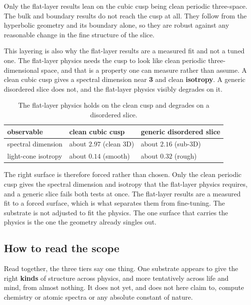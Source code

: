 \begin{principle}
Only the flat-layer results lean on the cubic cusp being clean periodic three-space. The bulk and boundary results do not reach the cusp at all. They follow from the hyperbolic geometry and its boundary alone, so they are robust against any reasonable change in the fine structure of the slice.
\end{principle}

This layering is also why the flat-layer results are a measured fit and not a tuned one. The flat-layer physics needs the cusp to look like clean periodic three-dimensional space, and that is a property one can measure rather than assume. A clean cubic cusp gives a spectral dimension near \textbf{3} and clean \textbf{isotropy}. A generic disordered slice does not, and the flat-layer physics visibly degrades on it.

\begin{table}[ht]
\centering
\begin{tabular}{@{}lll@{}}
\toprule
observable & clean cubic cusp & generic disordered slice \\
\midrule
spectral dimension & about $2.97$ (clean 3D) & about $2.16$ (sub-3D) \\
light-cone isotropy & about $0.14$ (smooth) & about $0.32$ (rough) \\
\bottomrule
\end{tabular}
\caption{The flat-layer physics holds on the clean cusp and degrades on a disordered slice.}
\label{tab:cusp-vs-disordered}
\end{table}

The right surface is therefore forced rather than chosen. Only the clean periodic cusp gives the spectral dimension and isotropy that the flat-layer physics requires, and a generic slice fails both tests at once. The flat-layer results are a measured fit to a forced surface, which is what separates them from fine-tuning. The substrate is not adjusted to fit the physics. The one surface that carries the physics is the one the geometry already singles out.

\subsection{How to read the scope}

Read together, the three tiers say one thing. One substrate appears to give the right \textbf{kinds} of structure across physics, and more tentatively across life and mind, from almost nothing. It does not yet, and does not here claim to, compute chemistry or atomic spectra or any absolute constant of nature.

